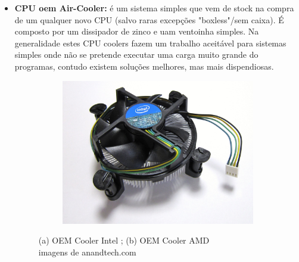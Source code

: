 \begin{itemize}
\item \textbf{CPU \ac{oem} Air-Cooler:} é um sistema simples que vem de stock na compra de um qualquer novo CPU (salvo raras excepções "boxless"/sem caixa). É composto por um dissipador de zinco e uam ventoinha simples. Na generalidade estes CPU coolers fazem um trabalho aceitável para sistemas simples onde não se pretende executar uma carga muito grande do programas, contudo existem soluções melhores, mas mais dispendiosas. 


\begin{figure}[H]
		\centering
		\begin{subfigure}[t]{0.45\textwidth}
			\centering
			\includegraphics[scale=0.1]{./oemintel.jpeg}
			\caption{}
			\label{fig.oemintel}
		\end{subfigure}
		\begin{subfigure}[t]{0.45\textwidth}
			\centering
			\caption{}
			\label{fig.oemamd}
			\end{subfigure}	
		\caption{(a) OEM Cooler Intel ; (b) OEM Cooler AMD \\ imagens de anandtech.com }
		\label{fig.oemcoolers}
	\end{figure}


\end{itemize}
